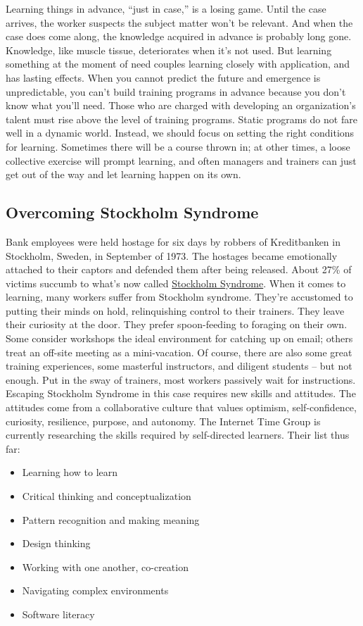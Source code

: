 Learning things in advance, ``just in case,'' is a losing game. Until
the case arrives, the worker suspects the subject matter won't be
relevant. And when the case does come along, the knowledge acquired in
advance is probably long gone. Knowledge, like muscle tissue,
deteriorates when it's not used. But learning something at the moment of
need couples learning closely with application, and has lasting effects.
When you cannot predict the future and emergence is unpredictable, you
can't build training programs in advance because you don't know what
you'll need. Those who are charged with developing an organization's
talent must rise above the level of training programs. Static programs
do not fare well in a dynamic world. Instead, we should focus on setting
the right conditions for learning. Sometimes there will be a course
thrown in; at other times, a loose collective exercise will prompt
learning, and often managers and trainers can just get out of the way
and let learning happen on its own.

\subsection{Overcoming Stockholm Syndrome}

Bank employees were held hostage for six days by robbers of Kreditbanken
in Stockholm, Sweden, in September of 1973. The hostages became
emotionally attached to their captors and defended them after being
released. About 27\% of victims succumb to what's now called
\href{http://http://en.wikipedia.org/wiki/Stockholm\_syndrome}{Stockholm
Syndrome}. When it comes to learning, many workers suffer from Stockholm
syndrome. They're accustomed to putting their minds on hold,
relinquishing control to their trainers. They leave their curiosity at
the door. They prefer spoon-feeding to foraging on their own. Some
consider workshops the ideal environment for catching up on email;
others treat an off-site meeting as a mini-vacation. Of course, there
are also some great training experiences, some masterful instructors,
and diligent students -- but not enough. Put in the sway of trainers,
most workers passively wait for instructions. Escaping Stockholm
Syndrome in this case requires new skills and attitudes. The attitudes
come from a collaborative culture that values optimism, self-confidence,
curiosity, resilience, purpose, and autonomy. The Internet Time Group is
currently researching the skills required by self-directed learners.
Their list thus far:

\begin{itemize}
\item
  Learning how to learn
\item
  Critical thinking and conceptualization
\item
  Pattern recognition and making meaning
\item
  Design thinking
\item
  Working with one another, co-creation
\item
  Navigating complex environments
\item
  Software literacy
\end{itemize}
